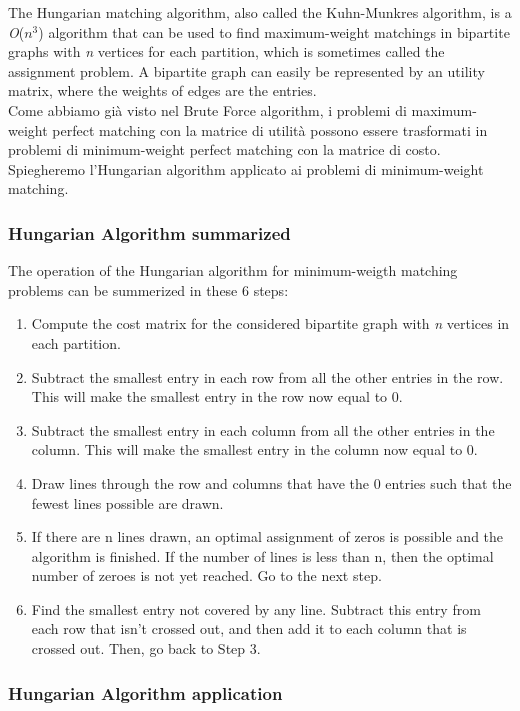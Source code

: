 The Hungarian matching algorithm, also called the Kuhn-Munkres algorithm, is a \textit{O}($\textit{n}^3$) algorithm that can be used to find maximum-weight matchings in bipartite graphs with \textit{n} vertices for each partition, which is sometimes called the assignment problem.
A bipartite graph can easily be represented by an utility matrix, where the weights of edges are the entries. \\
Come abbiamo già visto nel Brute Force algorithm, i problemi di maximum-weight perfect matching con la matrice di utilità possono essere trasformati in problemi di minimum-weight perfect matching con la matrice di costo.
Spiegheremo l'Hungarian algorithm applicato ai problemi di minimum-weight matching.
\\

\subsubsection{Hungarian Algorithm summarized}

The operation of the Hungarian algorithm for minimum-weigth matching problems can be summerized in these 6 steps:
\begin{enumerate}
    \item {Compute the cost matrix for the considered bipartite graph with \textit{n} vertices in each partition.}
    \item {Subtract the smallest entry in each row from all the other entries in the row. This will make the smallest entry in the row now equal to 0.}
    \item {Subtract the smallest entry in each column from all the other entries in the column. This will make the smallest entry in the column now equal to 0.}
    \item {Draw lines through the row and columns that have the 0 entries such that the fewest lines possible are drawn.}
    \item {If there are n lines drawn, an optimal assignment of zeros is possible and the algorithm is finished. If the number of lines is less than n, then the optimal number of zeroes is not yet reached. Go to the next step.}
    \item {Find the smallest entry not covered by any line. Subtract this entry from each row that isn’t crossed out, and then add it to each column that is crossed out. Then, go back to Step 3.}
\end{enumerate}

\subsubsection{Hungarian Algorithm application}

